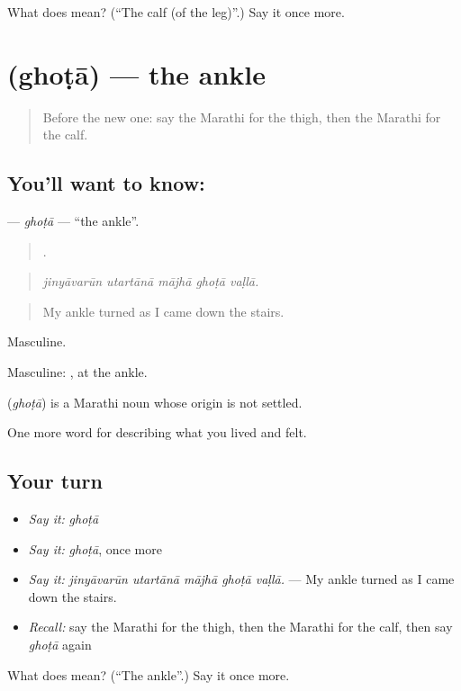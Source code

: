 \begin{tcolorbox}[breakable,colback=teal!4,colframe=teal!35!black,title={Before you move on}]
What does  mean? (\textquotedblleft{}The calf (of the leg)\textquotedblright{}.) Say it once more.
\end{tcolorbox}
\section[\texorpdfstring{\mr{घोटा} (ghoṭā)}{घोटा (ghoṭā)}]{ (ghoṭā) — the ankle}

\label{lesson:MR-C477-ghota}



\begin{quote}
Before the new one: say the Marathi for the thigh, then the Marathi for the calf.
\end{quote}

\subsection*{You'll want to know: }
\textbf{} — \emph{ghoṭā} — \textquotedblleft{}the ankle\textquotedblright{}.

\begin{quote}
    .
\end{quote}

\begin{quote}
\emph{jinyāvarūn utartānā mājhā ghoṭā vaḷlā.}
\end{quote}

\begin{quote}
My ankle turned as I came down the stairs.
\end{quote}

Masculine.

Masculine: , at the ankle.

\begin{cousinweb}
\textbf{} (\emph{ghoṭā}) is a Marathi noun whose origin is not settled.
\end{cousinweb}

\begin{grammarlens}[title={What you've built}]
One more word for describing what you lived and felt.
\end{grammarlens}

\subsection*{Your turn}
\begin{itemize}
\raggedright
  \item \emph{Say it:} \emph{ghoṭā}
  \item \emph{Say it:} \emph{ghoṭā}, once more
  \item \emph{Say it:} \emph{jinyāvarūn utartānā mājhā ghoṭā vaḷlā.} — My ankle turned as I came down the stairs.
  \item \emph{Recall:} say the Marathi for the thigh, then the Marathi for the calf, then say \emph{ghoṭā} again
\end{itemize}

\begin{tcolorbox}[breakable,colback=teal!4,colframe=teal!35!black,title={Before you move on}]
What does  mean? (\textquotedblleft{}The ankle\textquotedblright{}.) Say it once more.
\end{tcolorbox}
